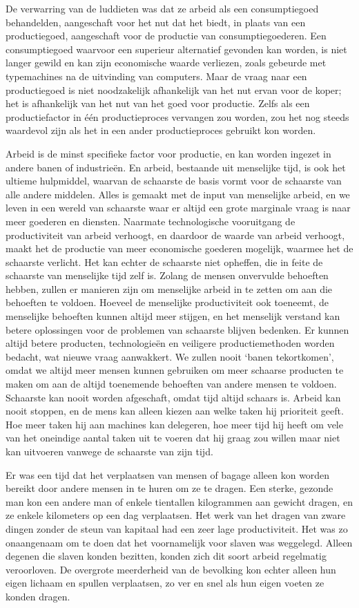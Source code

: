 \documentclass[
  a5paper,
  smalldemyvopaper,11pt,twoside,onecolumn,openright,extrafontsizes,
hidelinks]{memoir}
\begin{document}
De verwarring van de luddieten was dat ze arbeid als een consumptiegoed
behandelden, aangeschaft voor het nut dat het biedt, in plaats van een
productiegoed, aangeschaft voor de productie van consumptiegoederen. Een
consumptiegoed waarvoor een superieur alternatief gevonden kan worden,
is niet langer gewild en kan zijn economische waarde verliezen, zoals
gebeurde met typemachines na de uitvinding van computers. Maar de vraag
naar een productiegoed is niet noodzakelijk afhankelijk van het nut
ervan voor de koper; het is afhankelijk van het nut van het goed voor
productie. Zelfs als een productiefactor in één productieproces
vervangen zou worden, zou het nog steeds waardevol zijn als het in een
ander productieproces gebruikt kon worden.

Arbeid is de minst specifieke factor voor productie, en kan worden
ingezet in andere banen of industrieën. En arbeid, bestaande uit
menselijke tijd, is ook het ultieme hulpmiddel, waarvan de schaarste de
basis vormt voor de schaarste van alle andere middelen. Alles is gemaakt
met de input van menselijke arbeid, en we leven in een wereld van
schaarste waar er altijd een grote marginale vraag is naar meer goederen
en diensten. Naarmate technologische vooruitgang de productiviteit van
arbeid verhoogt, en daardoor de waarde van arbeid verhoogt, maakt het de
productie van meer economische goederen mogelijk, waarmee het de
schaarste verlicht. Het kan echter de schaarste niet opheffen, die in
feite de schaarste van menselijke tijd zelf is. Zolang de mensen
onvervulde behoeften hebben, zullen er manieren zijn om menselijke
arbeid in te zetten om aan die behoeften te voldoen. Hoeveel de
menselijke productiviteit ook toeneemt, de menselijke behoeften kunnen
altijd meer stijgen, en het menselijk verstand kan betere oplossingen
voor de problemen van schaarste blijven bedenken. Er kunnen altijd
betere producten, technologieën en veiligere productiemethoden worden
bedacht, wat nieuwe vraag aanwakkert. We zullen nooit `banen
tekortkomen', omdat we altijd meer mensen kunnen gebruiken om meer
schaarse producten te maken om aan de altijd toenemende behoeften van
andere mensen te voldoen. Schaarste kan nooit worden afgeschaft, omdat
tijd altijd schaars is. Arbeid kan nooit stoppen, en de mens kan alleen
kiezen aan welke taken hij prioriteit geeft. Hoe meer taken hij aan
machines kan delegeren, hoe meer tijd hij heeft om vele van het
oneindige aantal taken uit te voeren dat hij graag zou willen maar niet
kan uitvoeren vanwege de schaarste van zijn tijd.

Er was een tijd dat het verplaatsen van mensen of bagage alleen kon
worden bereikt door andere mensen in te huren om ze te dragen. Een
sterke, gezonde man kon een andere man of enkele tientallen kilogrammen
aan gewicht dragen, en ze enkele kilometers op een dag verplaatsen. Het
werk van het dragen van zware dingen zonder de steun van kapitaal had
een zeer lage productiviteit. Het was zo onaangenaam om te doen dat het
voornamelijk voor slaven was weggelegd. Alleen degenen die slaven konden
bezitten, konden zich dit soort arbeid regelmatig veroorloven. De
overgrote meerderheid van de bevolking kon echter alleen hun eigen
lichaam en spullen verplaatsen, zo ver en snel als hun eigen voeten ze
konden dragen.
\end{document}
